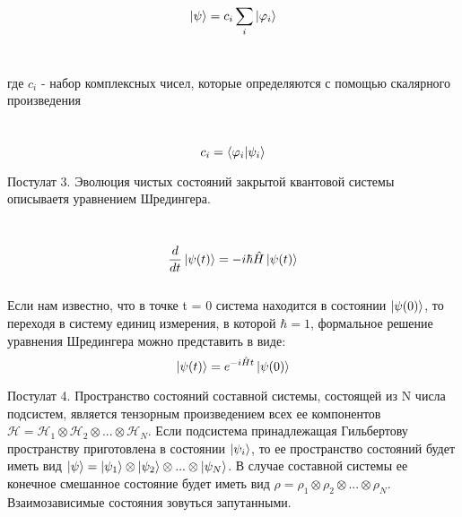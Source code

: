 \documentclass[a4paper, 10pt]{article}
\begin{document}
        \begin{equation}
            \ket{\psi}= c_i \sum_i \ket{\varphi_i}
        \end{equation}
        \\ 
        \begin{itshape}
            где $c_i$ - набор комплексных чисел, которые определяются с помощью скалярного произведения
        \end{itshape}
        \\

        \begin{equation}
            c_i = \bra{\varphi_i} \ket{\psi_i}
        \end{equation}

        
        \begin{itshape}
            Постулат 3. Эволюция чистых состояний закрытой квантовой системы описываетя уравнением Шредингера.
        \end{itshape}
        \\

        \begin{equation}
            \frac{d}{dt} \ket{\psi(t)} = -i \hbar \hat{H} \ket{\psi(t)}
        \end{equation}
        \\

        Если нам известно, что в точке t = 0 система находится в состоянии $\ket{\psi(0)}$, то переходя в систему единиц измерения, в которой $\hbar = 1$, формальное решение уравнения Шредингера можно представить в виде:
        \\
        \begin{equation}
            \ket{\psi(t)} = e^{-i\hat{H}t} \ket{\psi(0)}
        \end{equation}

        \begin{itshape}
            Постулат 4. Пространство состояний составной системы, состоящей из N числа подсистем, является тензорным произведением всех ее компонентов $\mathscr{H} = \mathscr{H}_1  \otimes  \mathscr{H}_2  \otimes ... \otimes \mathscr{H}_N$. Если подсистема принадлежащая Гильбертову пространству приготовлена в состоянии $\ket{\psi_i}$, 
            то ее пространство состояний будет иметь вид $\ket{\psi} = \ket{\psi_1}  \otimes  \ket{\psi_2}  \otimes  ... \otimes  \ket{\psi_N}$. В случае составной системы ее конечное смешанное состояние будет иметь вид $\rho = \rho_1  \otimes  \rho_2  \otimes ... \otimes \rho_N$. Взаимозависимые состояния зовуться запутанными.
        \end{itshape}
\end{document}
